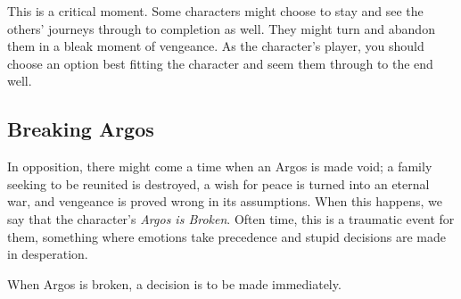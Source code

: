 \documentclass[../main.tex]{subfiles}
\begin{document}
        This is a critical moment. Some characters might choose to stay and see the others' journeys through to completion as well. They might turn and abandon them in a bleak moment of vengeance. As the character's player, you should choose an option best fitting the character and seem them through to the end well.

    \subsection{Breaking Argos}

        In opposition, there might come a time when an Argos is made void; a family seeking to be reunited is destroyed, a wish for peace is turned into an eternal war, and vengeance is proved wrong in its assumptions. When this happens, we say that the character's \emph{Argos is Broken}. Often time, this is a traumatic event for them, something where emotions take precedence and stupid decisions are made in desperation.

        When Argos is broken, a decision is to be made immediately.
\end{document}

